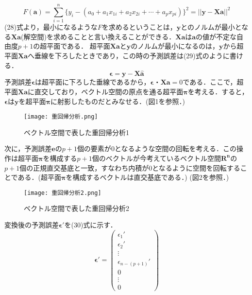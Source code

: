 \documentclass[dvipdfmx]{jsarticle}
\begin{document}
\begin{equation}
  F(\boldsymbol{a})=\sum_{i=1}^{n}\{ y_i - (a_0 + a_1x_{1i}+a_2x_{2i}+\cdots + a_p x_{pi})\}^2=||\boldsymbol{y}-\boldsymbol{Xa}||^2
\end{equation}
(28)式より，最小になるような$F$を求めるということは，$\boldsymbol{y}$とのノルムが最小となる$\boldsymbol{Xa}$(解空間)を求めることと言い換えることができる．$\boldsymbol{Xa}$は$\boldsymbol{a}$の値が不定な自由度$p+1$の超平面である．
超平面$\boldsymbol{Xa}$と$\boldsymbol{y}$のノルムが最小になるのは，$\boldsymbol{y}$から超平面$\boldsymbol{Xa}$へ垂線を下ろしたときであり，この時の予測誤差は(29)式のように書ける．
\begin{equation}
  \boldsymbol{\epsilon}=\boldsymbol{y}-\boldsymbol{X\hat{a}}
\end{equation}
予測誤差$\boldsymbol{\epsilon}$は超平面に下ろした垂線であるから，$\boldsymbol{\epsilon}・\boldsymbol{Xa}=0$である．ここで，超平面$\boldsymbol{Xa}$に直交しており，ベクトル空間の原点を通る超平面$\boldsymbol{\pi}$を考える．すると，$\boldsymbol{\epsilon}$は$\boldsymbol{y}$を超平面$\boldsymbol{\pi}$に射影したものだとみなせる．(図1を参照．)
\par
\begin{figure}[h]
  \begin{center}
    \texttt{[image: 重回帰分析.png]}
    \caption{ベクトル空間で表した重回帰分析1}
  \end{center}
\end{figure}
次に，予測誤差$\boldsymbol{e}$の$p+1$個の要素が$0$となるような空間の回転を考える．この操作は超平面$\boldsymbol{\pi}$を構成する$p+1$個のベクトルが今考えているベクトル空間$\boldsymbol{R^n}$の$p+1$個の正規直交基底と一致，すなわち内積が$0$となるように空間を回転することである．(超平面$\boldsymbol{\pi}$を構成するベクトルは直交基底である．)	(図2を参照．)
\begin{figure}[h]
  \begin{center}
    \texttt{[image: 重回帰分析2.png]}
    \caption{ベクトル空間で表した重回帰分析2}
  \end{center}
\end{figure}
変換後の予測誤差$\boldsymbol{\epsilon'}$を(30)式に示す．
\begin{equation}
  \boldsymbol{\epsilon'}=
  \left(
  \begin{array}{c}
      \epsilon_1'         \\
      \epsilon_2'         \\
      \vdots              \\
      \epsilon_{n-(p+1)}' \\
      0                   \\
      \vdots              \\
      0
    \end{array}
  \right)
\end{equation}
\end{document}
